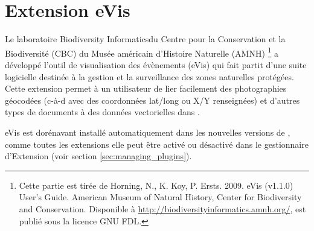 
\section{Extension eVis}\label{sec:evis}


Le laboratoire \og Biodiversity Informatics\fg du Centre pour la Conservation et la Biodiversité (CBC) du Musée américain d'Histoire Naturelle (AMNH) \footnote{Cette partie est tirée de Horning, N., K. Koy, P. Ersts. 2009. eVis (v1.1.0) User's Guide. American Museum of
Natural History, Center for Biodiversity and Conservation. Disponible à \url{http://biodiversityinformatics.amnh.org/}, est publié sous la licence GNU FDL.} a développé l'outil de visualisation des évènements (eVis) qui fait partit d'une suite logicielle destinée à la gestion et la surveillance des zones naturelles protégées. Cette extension permet à un utilisateur de lier facilement des photographies géocodées (c-à-d avec des coordonnées lat/long ou X/Y renseignées) et d'autres types de documents à des données vectorielles dans \qg.


eVis est dorénavant installé automatiquement dans les nouvelles versions de \qg, comme toutes les extensions elle peut être activé ou désactivé dans le gestionnaire d'Extension (voir section \ref{sec:managing_plugins}).

